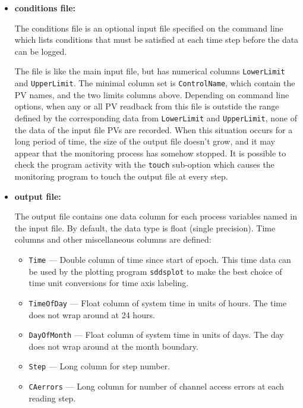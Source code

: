 \begin{itemize}
\begin{itemize}
\item {\bf conditions file:} \par
The conditions file is an optional input file specified on the command line which lists
conditions that must be satisfied at each time step before the data can be logged.

The file is like the main input file, but has numerical columns \verb+LowerLimit+ and \verb+UpperLimit+.
The minimal column set is \verb+ControlName+, which contain the PV names, and the two limits columns above.
Depending on command line options, when any or all PV readback from this file
is outstide the range defined by the corresponding data from \verb+LowerLimit+ and \verb+UpperLimit+,
none of the data of the input file PVs are recorded. 
When this situation occurs for a long period of time, the size of the output file doesn't
grow, and it may appear that the monitoring process has somehow stopped.
It is possible to check the program activity with the \verb+touch+ sub-option
which causes the monitoring program to touch the output file at every step.

\item {\bf output file:}\par
The output file contains one data column for each process variables named in the input file. By default,
the data type is float (single precision).
Time columns and other miscellaneous columns are defined: 
\begin{itemize}
        \item {\tt Time} --- Double column of time since start of epoch. This time data can be used by
        the plotting program {\verb+sddsplot+} to make the best choice of time unit conversions
        for time axis labeling.
        \item {\tt TimeOfDay} --- Float column of system time in units of hours. 
        The time does not wrap around at 24 hours.
        \item {\tt DayOfMonth} --- Float column of system time in units of days. 
        The day does not wrap around at the month boundary.
        \item {\tt Step} --- Long column for step number.
        \item {\tt CAerrors} --- Long column for number of channel access errors at each reading step. 
\end{itemize}


\end{itemize}
\end{itemize}
